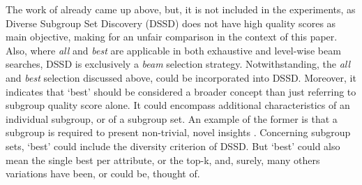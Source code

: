 \documentclass[smallextended]{svjour3}
\newcommand{\parameter}{\emph}
\newcommand{\all}{\parameter{all}}
\newcommand{\best}{\parameter{best}}
\begin{document}

The work of \cite{leeuwen:2012} already came up above, but, it is not included in the experiments, as Diverse Subgroup Set Discovery (DSSD) does not have high quality scores as main objective, making for an unfair comparison in the context of this paper.
Also, where \all{} and \best{} are applicable in both exhaustive and level-wise beam searches, DSSD is exclusively a \emph{beam} selection strategy. %
Notwithstanding, the \all{} and \best{} selection discussed above, could be incorporated into DSSD.
Moreover, it indicates that `best' should be considered a broader concept than just referring to subgroup quality score alone.
It could encompass additional characteristics of an individual subgroup, or of a subgroup set.
An example of the former is that a subgroup is required to present non-trivial, novel insights \cite{konijn:2013:pakdd}.
Concerning subgroup sets, `best' could include the diversity criterion of DSSD.
But `best' could also mean the single best per attribute, or the top-k, and, surely, many others variations have been, or could be, thought of.
\end{document}
